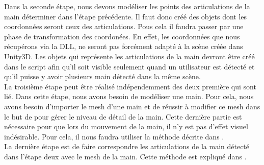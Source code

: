 Dans la seconde étape, nous devons modéliser les points des articulations de la main déterminer 
dans l'étape précédente. Il faut donc créé des objets dont les coordonnées seront ceux des articulations.
Pous cela il faudra passer par une phase de transformation des coordonées. En effet, les coordonnées
que nous récupérons via la DLL, ne seront pas forcément adapté à la scène créée dans Unity3D. Les 
objets qui représente les articulations de la main devront être créé dans le script afin qu'il 
soit visible seulement quand un utilisateur est détecté et qu'il puisse y avoir plusieurs main
détecté dans la même scène.\\

La troisième étape peut être réalisé indépendemment des deux première qui sont lié. Dans cette étape,
nous avons besoin de modéliser une main. Pour cela, nous avons besoin d'importer le mesh d'une main et
de réussir à modifier ce mesh dans le but de pour gérer le niveau de détail de la main. Cette dernière
partie est nécessaire pour que lors du mouvement de la main, il n'y est pas d'effet visuel indésirable.
Pour cela, il nous faudra utiliser la méthode décrite dans \cite{export:217428}.\\

La dernière étape est de faire correspondre les articulations de la main détecté dans l'étape deux avec
le mesh de la main. Cette méthode est expliqué dans \cite{export:217428}.


